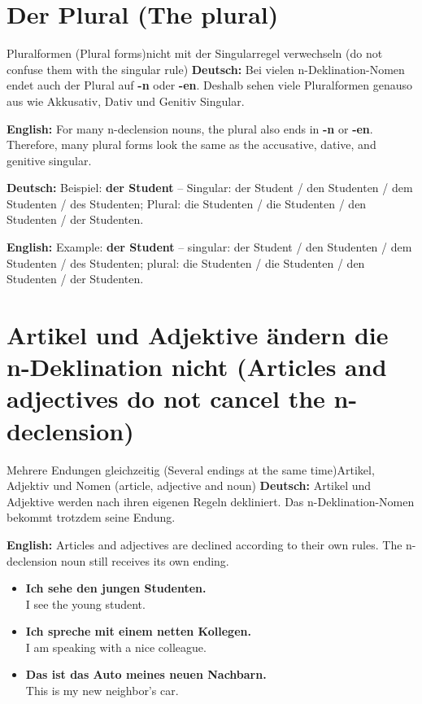 \documentclass[a4paper,11pt]{article}
\newcommand{\GermanText}[1]{\textbf{Deutsch: }#1\par}
\newcommand{\EnglishText}[1]{{\small\color{SoftGray}\textbf{English: }#1\par}}
\newcommand{\ExampleItem}[2]{\item \textbf{#1}\\{\small\color{SoftGray}#2}}
\begin{document}
    \section{Der Plural \textnormal{(The plural)}}

        \begin{grammarentry}{Pluralformen \textnormal{(Plural forms)}}{nicht mit der Singularregel verwechseln \textnormal{(do not confuse them with the singular rule)}}
            \GermanText{Bei vielen n-Deklination-Nomen endet auch der Plural auf \textbf{-n} oder \textbf{-en}. Deshalb sehen viele Pluralformen genauso aus wie Akkusativ, Dativ und Genitiv Singular.}
            \EnglishText{For many n-declension nouns, the plural also ends in \textbf{-n} or \textbf{-en}. Therefore, many plural forms look the same as the accusative, dative, and genitive singular.}

            \GermanText{Beispiel: \textbf{der Student} -- Singular: der Student / den Studenten / dem Studenten / des Studenten; Plural: die Studenten / die Studenten / den Studenten / der Studenten.}
            \EnglishText{Example: \textbf{der Student} -- singular: der Student / den Studenten / dem Studenten / des Studenten; plural: die Studenten / die Studenten / den Studenten / der Studenten.}
        \end{grammarentry}

    \section{Artikel und Adjektive ändern die n-Deklination nicht \textnormal{(Articles and adjectives do not cancel the n-declension)}}

        \begin{grammarentry}{Mehrere Endungen gleichzeitig \textnormal{(Several endings at the same time)}}{Artikel, Adjektiv und Nomen \textnormal{(article, adjective and noun)}}
            \GermanText{Artikel und Adjektive werden nach ihren eigenen Regeln dekliniert. Das n-Deklination-Nomen bekommt trotzdem seine Endung.}
            \EnglishText{Articles and adjectives are declined according to their own rules. The n-declension noun still receives its own ending.}
        \end{grammarentry}

        \begin{exbox}
            \begin{itemize}
                \ExampleItem{Ich sehe den jungen Studenten.}{I see the young student.}
                \ExampleItem{Ich spreche mit einem netten Kollegen.}{I am speaking with a nice colleague.}
                \ExampleItem{Das ist das Auto meines neuen Nachbarn.}{This is my new neighbor's car.}
            \end{itemize}
        \end{exbox}
\end{document}
